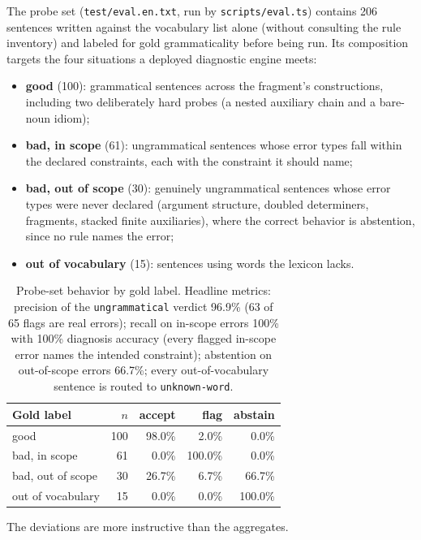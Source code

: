 \documentclass[11pt]{article}
\theoremstyle{definition}
\theoremstyle{plain}
\theoremstyle{remark}
\begin{document}
The probe set (\texttt{test/eval.en.txt}, run by \texttt{scripts/eval.ts}) contains 206
sentences written against the vocabulary list alone (without consulting the rule
inventory) and labeled for gold grammaticality before being run. Its composition targets
the four situations a deployed diagnostic engine meets:

\begin{itemize}[leftmargin=2em]
  \item \textbf{good} (100): grammatical sentences across the fragment's constructions,
        including two deliberately hard probes (a nested auxiliary chain and a
        bare-noun idiom);
  \item \textbf{bad, in scope} (61): ungrammatical sentences whose error types fall
        within the declared constraints, each with the constraint it should name;
  \item \textbf{bad, out of scope} (30): genuinely ungrammatical sentences whose error
        types were never declared (argument structure, doubled determiners, fragments,
        stacked finite auxiliaries), where the correct behavior is abstention, since no
        rule names the error;
  \item \textbf{out of vocabulary} (15): sentences using words the lexicon lacks.
\end{itemize}

\begin{table}[H]
\centering
\begin{tabular}{@{}lrrrr@{}}
\toprule
Gold label & $n$ & accept & flag & abstain \\
\midrule
good                & 100 & 98.0\% & 2.0\%   & 0.0\% \\
bad, in scope       & 61  & 0.0\%  & 100.0\% & 0.0\% \\
bad, out of scope   & 30  & 26.7\% & 6.7\%   & 66.7\% \\
out of vocabulary   & 15  & 0.0\%  & 0.0\%   & 100.0\% \\
\bottomrule
\end{tabular}
\caption{Probe-set behavior by gold label. Headline metrics: precision of the
\texttt{ungrammatical} verdict 96.9\% (63 of 65 flags are real errors); recall on
in-scope errors 100\% with 100\% diagnosis accuracy (every flagged in-scope error names
the intended constraint); abstention on out-of-scope errors 66.7\%; every
out-of-vocabulary sentence is routed to \texttt{unknown-word}.}
\end{table}

The deviations are more instructive than the aggregates.
\end{document}

